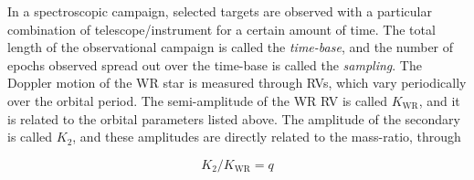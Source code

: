 In a spectroscopic campaign, selected targets are observed with a particular combination of telescope/instrument for a certain amount of time. The total length of the observational campaign is called the \textit{time-base}, and the number of epochs observed spread out over the time-base is called the \textit{sampling}. The Doppler motion of the WR star is measured through RVs, which vary periodically over the orbital period. The semi-amplitude of the WR RV is called $K_{\textrm{WR}}$, and it is related to the orbital parameters listed above. The amplitude of the secondary is called $K_2$, and these amplitudes are directly related to the mass-ratio, through 

\begin{equation}
    K_2/K_{\textrm{WR}} = q 
\end{equation}

